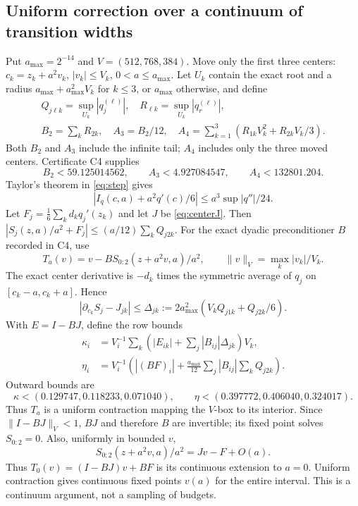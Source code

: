 \documentclass[11pt,a4paper]{article}
\numberwithin{equation}{section}
\theoremstyle{remark}\newtheorem{remark}[theorem]{Remark}
\newcommand{\norm}[1]{\lVert#1\rVert}
\begin{document}
\subsection{Uniform correction over a continuum of transition widths}
Put $a_{\max}=2^{-14}$ and $V=(512,768,384)$. Move only the first three
centers: $c_k=z_k+a^2v_k$, $|v_k|\le V_k$, $0<a\le a_{\max}$.
Let $U_k$ contain the exact root and a radius
$a_{\max}+a_{\max}^2V_k$ for $k\le3$, or $a_{\max}$ otherwise, and define
\begin{equation}
 \begin{gathered}
 Q_{j\ell k}=\sup_{U_k}|q_j^{(\ell)}|,\quad
 R_{\ell k}=\sup_{U_k}|q_r^{(\ell)}|,\\
 B_2=\sum_kR_{2k},\quad A_3=B_2/12,\quad
 A_4=\sum_{k=1}^3(R_{1k}V_k^2+R_{2k}V_k/3).
 \end{gathered}\label{eq:bounds}
\end{equation}
Both $B_2$ and $A_3$ include the infinite tail; $A_4$ includes only the
three moved centers. Certificate C4 supplies
\begin{equation}
 B_2<59.125014562,\qquad A_3<4.927084547,\qquad A_4<132801.204.
\end{equation}
Taylor's theorem in \eqref{eq:step} gives
\begin{equation}
 |I_q(c,a)+a^2q'(c)/6|\le a^3\sup|q''|/24.\label{eq:stepremainder}
\end{equation}
Let $F_j=\frac16\sum_kd_kq_j'(z_k)$ and let $J$ be \eqref{eq:centerJ}.
Then $|S_j(z,a)/a^2+F_j|\le(a/12)\sum_kQ_{j2k}$.
For the exact dyadic preconditioner $B$ recorded in C4, use
\begin{equation}
 T_a(v)=v-BS_{0:2}(z+a^2v,a)/a^2,
 \qquad \norm v_V=\max_k|v_k|/V_k.\label{eq:fixedpoint}
\end{equation}
The exact center derivative is $-d_k$ times the symmetric average of
$q_j$ on $[c_k-a,c_k+a]$. Hence
\begin{equation}
 |\partial_{c_k}S_j-J_{jk}|
 \le\Delta_{jk}:=2a_{\max}^2(V_kQ_{j1k}+Q_{j2k}/6).
\end{equation}
With $E=I-BJ$, define the row bounds
\begin{align}
 \kappa_i&=V_i^{-1}\sum_k
  (|E_{ik}|+\sum_j|B_{ij}|\Delta_{jk})V_k,\\
 \eta_i&=V_i^{-1}\left(|(BF)_i|+
             \frac{a_{\max}}{12}\sum_j|B_{ij}|\sum_kQ_{j2k}\right).
\end{align}
Outward bounds are
\begin{equation}
 \kappa<(0.129747,0.118233,0.071040),\qquad
 \eta<(0.397772,0.406040,0.324017).\label{eq:kappa}
\end{equation}
Thus $T_a$ is a uniform contraction mapping the $V$-box to its interior.
Since $\norm{I-BJ}_V<1$, $BJ$ and therefore $B$ are invertible;
its fixed point solves $S_{0:2}=0$. Also, uniformly in bounded $v$,
\begin{equation}
 S_{0:2}(z+a^2v,a)/a^2=Jv-F+O(a).
\end{equation}
Thus $T_0(v)=(I-BJ)v+BF$ is its continuous extension to $a=0$.
Uniform contraction gives continuous fixed points $v(a)$ for the entire
interval. This is a continuum argument, not a sampling of budgets.
\end{document}
